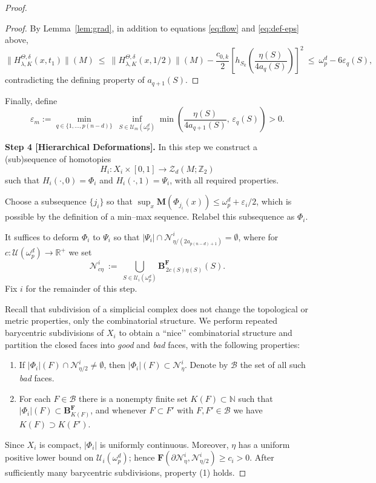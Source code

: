 \documentclass[10pt,a4paper]{amsart}
\begin{document}
\begin{proof}
\begin{proof}
By Lemma~\ref{lem:grad}, in addition to equations \eqref{eq:flow} and \eqref{eq:def-eps} above,
\[
\|H^{\Theta,\delta}_{\lambda,K}(x,t_1)\|(M)
\ \le\ \|H^{\Theta,\delta}_{\lambda,K}(x,1/2)\|(M)-\frac{c_{0,k}}{2}\left[h_{S_k}\!\left(\frac{\eta(S)}{4a_q(S)}\right)\right]^2
\ \le\ \omega^d_p-6\varepsilon_q(S),
\]
contradicting the defining property of $a_{q+1}(S)$.
\end{proof}

Finally, define
\[
\varepsilon_m:=\min_{q\in\{1,\dots,p(n-d)\}}\ \inf_{S\in\mathcal{U}_m(\omega^d_p)}
\min\!\left(\frac{\eta(S)}{4a_{q+1}(S)},\,\varepsilon_q(S)\right)>0.
\]

\textbf{Step 4 [Hierarchical Deformations].}
In this step we construct a (sub)sequence of homotopies
\[
H_i: X_i \times [0,1] \longrightarrow \mathcal Z_d(M; \mathbb Z_2)
\]
such that \(H_i(\cdot,0)=\Phi_i\) and \(H_i(\cdot,1)=\Psi_i\), with all required properties.

Choose a subsequence \(\{j_i\}\) so that \(\sup_x \mathbf M(\Phi_{j_i}(x)) \le \omega^d_p + \varepsilon_i/2\), which is possible by the definition of a min--max sequence. Relabel this subsequence as \(\Phi_i\).

It suffices to deform \(\Phi_i\) to \(\Psi_i\) so that
\(|\Psi_i|\cap \mathcal N^i_{\eta/(2a_{p(n-d)+1})}=\emptyset\), where for
\(c:\mathcal U(\omega^d_p)\to\mathbb R^+\) we set
\[
\mathcal N^i_{c\eta}\ :=\ \bigcup_{S\in\mathcal U_i(\omega^d_p)} \mathbf B^{\mathbf F}_{\,2c(S)\eta(S)}(S).
\]
Fix \(i\) for the remainder of this step.

Recall that subdivision of a simplicial complex does not change the topological or metric properties, only the combinatorial structure. We perform repeated barycentric subdivisions of \(X_i\) to obtain a “nice’’ combinatorial structure and partition the closed faces into \textit{good} and \textit{bad} faces, with the following properties:
\begin{enumerate}
  \item If \(|\Phi_i|(F)\cap \mathcal N^i_{\eta/2}\neq\emptyset\), then \(|\Phi_i|(F)\subset \mathcal N^i_\eta\). Denote by \(\mathcal B\) the set of all such \textit{bad} faces.
  \item For each \(F\in\mathcal B\) there is a nonempty finite set \(K(F)\subset\mathbb N\) such that \(|\Phi_i|(F)\subset \mathbf B^{\mathbf F}_{K(F)}\), and whenever \(F\subset F'\) with \(F,F'\in\mathcal B\) we have \(K(F)\supset K(F')\).
\end{enumerate}
Since \(X_i\) is compact, \(|\Phi_i|\) is uniformly continuous. Moreover, \(\eta\) has a uniform positive lower bound on \(\mathcal U_i(\omega^d_p)\); hence \(\mathbf F(\partial\mathcal N^i_\eta,\mathcal N^i_{\eta/2})\ge c_i>0\). After sufficiently many barycentric subdivisions, property (1) holds.


\end{proof}
\end{document}
